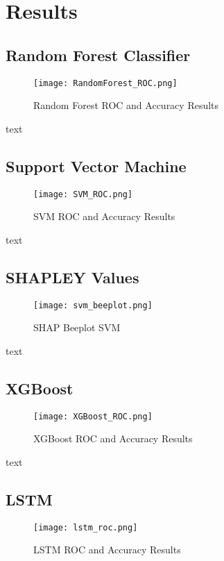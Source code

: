 \chapter*{Results}
\setcounter{chapter}{4}


\section{Random Forest Classifier}
\begin{figure}[htpb]
    \centering
    \texttt{[image: RandomForest\_ROC.png]}
    \caption{Random Forest ROC and Accuracy Results}
    \label{fig:random-forest-roc}
\end{figure}

text 

\section{Support Vector Machine}
\begin{figure}[htbp]
    \centering
    \texttt{[image: SVM\_ROC.png]}
    \caption{SVM ROC and Accuracy Results}
    \label{fig:svm-roc}
\end{figure}

text 

\section{SHAPLEY Values}
\begin{figure}[htpb]
    \centering
    \texttt{[image: svm\_beeplot.png]}
    \caption{SHAP Beeplot SVM}
    \label{fig:svm-beeplot}
\end{figure}

text 

\section{XGBoost}
\begin{figure}[htpb]
    \centering
    \texttt{[image: XGBoost\_ROC.png]}
    \caption{XGBoost ROC and Accuracy Results}
    \label{fig:xgboost-roc}
\end{figure}

text 

\section{LSTM}
\begin{figure}[htpb]
    \centering
    \texttt{[image: lstm\_roc.png]}
    \caption{LSTM ROC and Accuracy Results}
    \label{fig:lstm-roc}
\end{figure}
